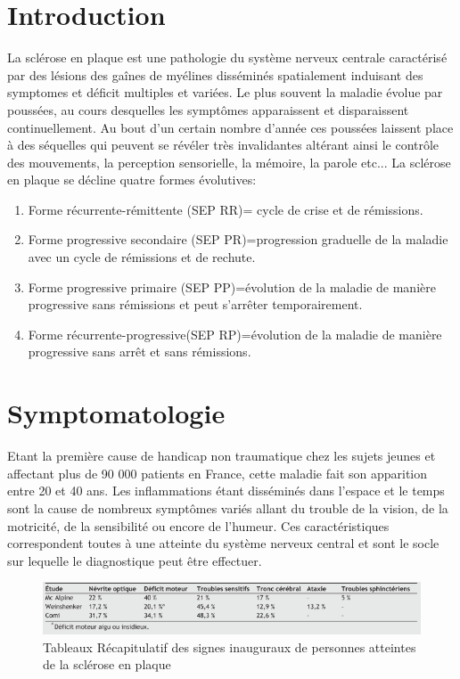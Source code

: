 \documentclass{comjnl}
\begin{document}
\maketitle


\section{Introduction}
La sclérose en plaque est une pathologie du système nerveux centrale caractérisé par des lésions des gaînes de myélines disséminés spatialement induisant des symptomes et déficit multiples et variées.
Le plus souvent la maladie évolue par poussées, au cours desquelles les symptômes apparaissent et disparaissent continuellement. Au bout d’un certain nombre d’année ces poussées laissent place à des séquelles qui peuvent se révéler très invalidantes altérant ainsi le contrôle des mouvements, la perception sensorielle, la mémoire, la parole etc...
La sclérose en plaque se décline quatre formes évolutives:
\begin{enumerate}
\item Forme récurrente-rémittente (SEP RR)= cycle de crise et de rémissions.
\item Forme progressive secondaire (SEP PR)=progression graduelle de la maladie avec un cycle de rémissions et de rechute.
\item Forme progressive primaire (SEP PP)=évolution de la maladie de manière progressive sans rémissions et peut s’arrêter temporairement.
\item Forme récurrente-progressive(SEP RP)=évolution de la maladie de manière progressive sans arrêt et sans rémissions.
\end{enumerate}



\section{Symptomatologie}
Etant la première cause de handicap non traumatique chez les sujets jeunes et affectant plus de 90 000 patients en France, cette maladie fait son apparition entre 20 et 40 ans.
Les inflammations étant disséminés dans l'espace et le temps sont la cause de nombreux symptômes variés allant du trouble de la vision, de la motricité, de la sensibilité ou encore de l'humeur. Ces caractéristiques correspondent toutes à une atteinte du système nerveux central et sont le socle sur lequelle le diagnostique peut être effectuer.
\begin{figure}[h!]
\includegraphics[width=1 \textwidth]{signe_inauguraux.png}
\caption{Tableaux Récapitulatif des signes inauguraux de personnes atteintes de la sclérose en plaque \cite{Ouallet2004}}
\end{figure}
\end{document}
